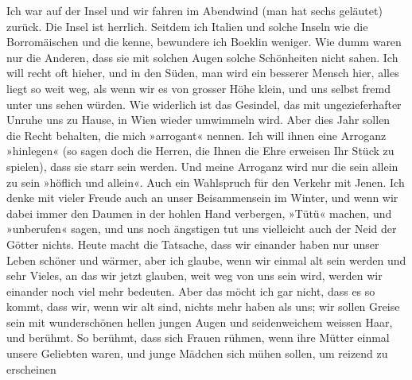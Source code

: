 \pstart
           Ich war auf der Insel und wir fahren im Abendwind (man hat sechs geläutet) zurück.
               Die Insel ist herrlich. Seitdem ich Italien und
               solche Inseln wie die Borromäischen und die
               kenne, bewundere ich Boeklin weniger. Wie dumm
               waren nur die Anderen, dass sie mit solchen Augen solche Schönheiten nicht sahen. Ich
               will recht oft hieher, und in den Süden, man wird ein besserer Mensch hier, alles
               liegt so weit weg, als wenn wir es von grosser Höhe klein, und uns selbst fremd unter
               uns sehen würden. {\pb}Wie widerlich ist das Gesindel, das
               mit ungezieferhafter Unruhe uns zu Hause, in Wien
               wieder umwimmeln wird. Aber dies Jahr sollen die Recht behalten, die mich »arrogant«
               nennen. Ich will ihnen eine Arroganz »hinlegen« (so sagen doch die Herren, die Ihnen
               die Ehre erweisen Ihr Stück zu
               spielen), dass sie starr sein werden. Und meine Arroganz wird nur die sein allein zu
               sein »höflich und allein«. Auch ein Wahlspruch für den Verkehr mit Jenen. Ich denke
               mit vieler Freude auch an unser Beisammensein im Winter, und wenn wir dabei immer den
               Daumen in der hohlen Hand verbergen, »Tütü« machen, und »unberufen« sagen, und uns
               noch ängstigen tut uns vielleicht auch der Neid der Götter nichts. Heute macht die
               Tatsache, dass wir einander haben nur unser Leben schöner und wärmer, aber ich
               glaube, wenn wir einmal alt sein werden und sehr Vieles, an das wir jetzt glauben,
               weit weg von uns sein wird, werden wir einander noch viel mehr bedeuten. Aber das
               möcht ich gar nicht, dass es so kommt, {\pb}dass wir, wenn
               wir alt sind, nichts mehr haben als uns; wir sollen Greise sein mit wunderschönen
               hellen jungen Augen und seidenweichem weissen Haar, und  berühmt. So berühmt, dass sich Frauen rühmen, wenn ihre Mütter einmal
               unsere Geliebten waren, und junge Mädchen sich mühen sollen, um reizend zu erscheinen
